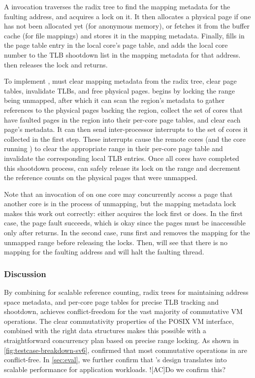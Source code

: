 A  invocation traverses the radix tree to find the
mapping metadata for the faulting address, and acquires a lock on it.
It then allocates a physical page if one has not been allocated yet
(for anonymous memory), or fetches it from the buffer cache (for file
mappings) and
stores it in the mapping metadata.  Finally,  fills in the
page table entry in the local core's page table, and adds the local core
number to the TLB shootdown list in the mapping metadata for that address.
 then releases the lock and returns.

To implement , \vm must clear mapping metadata from the
radix tree, clear page tables, invalidate TLBs, and free physical
pages.   begins by locking the range being unmapped,
after which it can scan the region's metadata to gather references to
the physical pages backing the region, collect the set of cores that
have faulted pages in the region into their per-core page tables, and
clear each page's metadata.  It can then send inter-processor
interrupts to the set of cores it collected in the first step.  These
interrupts cause the remote cores (and the core running )
to clear the appropriate range in their per-core page table and
invalidate the corresponding local TLB entries.  Once all cores have
completed this shootdown process,  can safely release its
lock on the range and decrement the reference counts on the physical
pages that were unmapped.

Note that an invocation of  on one core may concurrently
access a page that another core is in the process of unmapping,
but the mapping metadata lock makes this work out correctly: either
 acquires the lock first or  does.  In the
first case, the page fault succeeds, which is okay since the pages must be
inaccessible only after  returns.  In the second case,
 runs first and removes the mapping for the unmapped range
before releasing the locks. Then,  will see that there
is no mapping for the faulting address and will halt the faulting thread.

\subsubsection{Discussion}

By combining  for scalable reference counting, radix trees
for maintaining address space metadata, and per-core page tables for
precise TLB tracking and shootdown, \vm achieves conflict-freedom for
the vast majority of commutative VM operations.  The clear
commutativity properties of the POSIX VM interface, combined with the
right data structures makes this possible with a straightforward
concurrency plan based on precise range locking.
%
As shown in \cref{fig:testcase-breakdown-sv6}, \tool confirmed that
most commutative operations in \vm are conflict-free.  In
\cref{sec:eval}, we further confirm that \vm's design translates into
scalable performance for application workloads. \XXX![AC]{Do we
  confirm this?}
